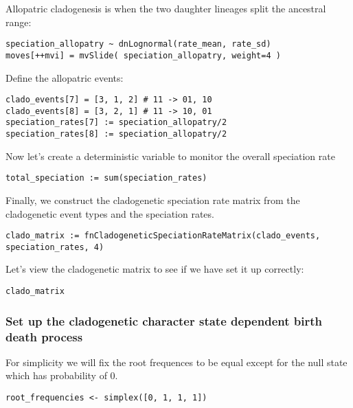 Allopatric cladogenesis is when the two daughter lineages
split the ancestral range:
{\tt \begin{snugshade*}
\begin{lstlisting}
speciation_allopatry ~ dnLognormal(rate_mean, rate_sd)
moves[++mvi] = mvSlide( speciation_allopatry, weight=4 )
\end{lstlisting}
\end{snugshade*}}

Define the allopatric events:
{\tt \begin{snugshade*}
\begin{lstlisting}
clado_events[7] = [3, 1, 2] # 11 -> 01, 10
clado_events[8] = [3, 2, 1] # 11 -> 10, 01
speciation_rates[7] := speciation_allopatry/2
speciation_rates[8] := speciation_allopatry/2
\end{lstlisting}
\end{snugshade*}}

Now let's create a deterministic variable to monitor the overall speciation rate
{\tt \begin{snugshade*}
\begin{lstlisting}
total_speciation := sum(speciation_rates)
\end{lstlisting}
\end{snugshade*}}

Finally, we construct the cladogenetic speciation rate
matrix from the cladogenetic event types and the speciation rates.
{\tt \begin{snugshade*}
\begin{lstlisting}
clado_matrix := fnCladogeneticSpeciationRateMatrix(clado_events, speciation_rates, 4)
\end{lstlisting}
\end{snugshade*}}

Let's view the cladogenetic matrix to see if we have set it up correctly:
{\tt \begin{snugshade*}
\begin{lstlisting}
clado_matrix
\end{lstlisting}
\end{snugshade*}}

\subsubsection{Set up the cladogenetic character state dependent birth death process}

For simplicity we will fix the root frequences to be equal except for the null state
which has probability of 0.
{\tt \begin{snugshade*}
\begin{lstlisting}
root_frequencies <- simplex([0, 1, 1, 1])
\end{lstlisting}
\end{snugshade*}}


